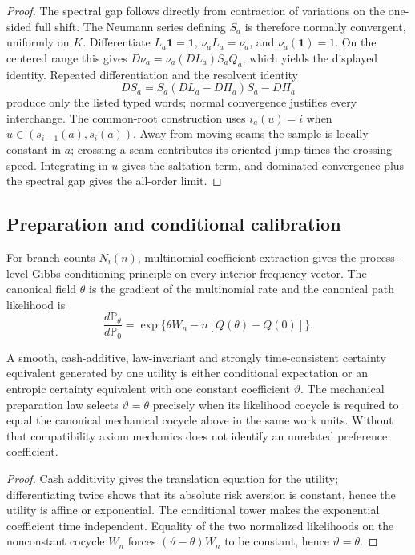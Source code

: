 \begin{proof}
The spectral gap follows directly from contraction of variations on the
one-sided full shift.  The Neumann series defining \(S_a\) is therefore
normally convergent, uniformly on \(K\).  Differentiate
\(L_a\mathbf1=\mathbf1\), \(\nu_aL_a=\nu_a\), and
\(\nu_a(\mathbf1)=1\).  On the centered range this gives
\(D\nu_a=\nu_a(DL_a)S_aQ_a\), which yields the displayed identity.
Repeated differentiation and the resolvent identity
\[
 DS_a=S_a(DL_a-D\Pi_a)S_a-D\Pi_a
\]
produce only the listed typed words; normal convergence justifies every
interchange.  The common-root construction uses
\(i_a(u)=i\) when \(u\in(s_{i-1}(a),s_i(a))\).  Away from moving seams the
sample is locally constant in \(a\); crossing a seam contributes its oriented
jump times the crossing speed.  Integrating in \(u\) gives the saltation term,
and dominated convergence plus the spectral gap gives the all-order limit.
\end{proof}

\subsection{Preparation and conditional calibration}

For branch counts \(N_i(n)\), multinomial coefficient extraction gives the
process-level Gibbs conditioning principle on every interior frequency vector.
The canonical field \(\theta\) is the gradient of the multinomial rate and the
canonical path likelihood is
\[
 \frac{d\mathbb P_\theta}{d\mathbb P_0}
 =\exp\{\theta W_n-n[Q(\theta)-Q(0)]\}.
\]

\begin{theorem}
\label{thm:r5-a1-calibration}
A smooth, cash-additive, law-invariant and strongly time-consistent certainty
equivalent generated by one utility is either conditional expectation or an
entropic certainty equivalent with one constant coefficient \(\vartheta\).
The mechanical preparation law selects \(\vartheta=\theta\) precisely when
its likelihood cocycle is required to equal the canonical mechanical cocycle
above in the same work units.  Without that compatibility axiom mechanics does
not identify an unrelated preference coefficient.
\end{theorem}

\begin{proof}
Cash additivity gives the translation equation for the utility; differentiating
twice shows that its absolute risk aversion is constant, hence the utility is
affine or exponential.  The conditional tower makes the exponential
coefficient time independent.  Equality of the two normalized likelihoods on
the nonconstant cocycle \(W_n\) forces
\((\vartheta-\theta)W_n\) to be constant, hence \(\vartheta=\theta\).
\end{proof}


